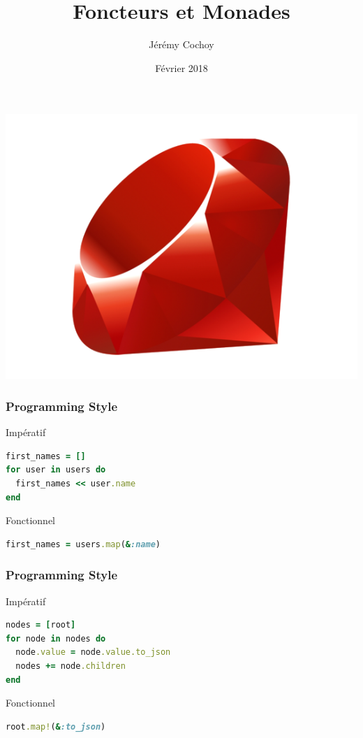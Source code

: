 \documentclass{beamer}
\begin{document}
\title{Foncteurs et Monades}
\author{Jérémy Cochoy}
\date{Février 2018}


\begin{frame}
\maketitle
\begin{center}
\includegraphics[scale=0.2]{ruby}
\end{center}
\end{frame}

\begin{frame}[fragile]
\frametitle{Programming Style}
\begin{block}{Impératif}
\begin{lstlisting}[language=ruby,basicstyle=\ttfamily,keywordstyle=\color{red}]
first_names = []
for user in users do
  first_names << user.name
end
\end{lstlisting}
\end{block}
\begin{block}{Fonctionnel}
\begin{lstlisting}[language=ruby,basicstyle=\ttfamily,keywordstyle=\color{red}]
first_names = users.map(&:name)
\end{lstlisting}
\end{block}
\end{frame}

\begin{frame}[fragile]
\frametitle{Programming Style}
\begin{block}{Impératif}
\begin{lstlisting}[language=ruby,basicstyle=\ttfamily,keywordstyle=\color{red}]
nodes = [root]
for node in nodes do
  node.value = node.value.to_json
  nodes += node.children
end
\end{lstlisting}
\end{block}
\begin{block}{Fonctionnel}
\begin{lstlisting}[language=ruby,basicstyle=\ttfamily,keywordstyle=\color{red}]
root.map!(&:to_json)
\end{lstlisting}
\end{block}
\end{frame}
\end{document}
